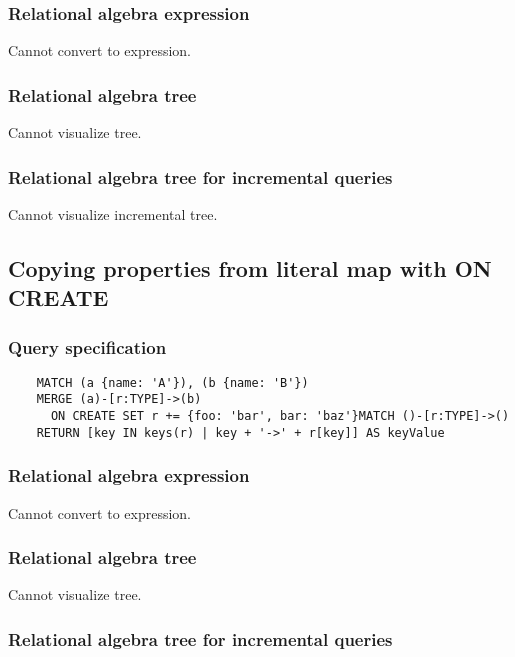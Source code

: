 	\subsubsection*{Relational algebra expression}

	Cannot convert to expression.

	\subsubsection*{Relational algebra tree}

	Cannot visualize tree.

	\subsubsection*{Relational algebra tree for incremental queries}

	Cannot visualize incremental tree.
	\subsection{Copying properties from literal map with ON CREATE}

	\subsubsection*{Query specification}

	\begin{lstlisting}
	MATCH (a {name: 'A'}), (b {name: 'B'})
	MERGE (a)-[r:TYPE]->(b)
	  ON CREATE SET r += {foo: 'bar', bar: 'baz'}MATCH ()-[r:TYPE]->()
	RETURN [key IN keys(r) | key + '->' + r[key]] AS keyValue
	\end{lstlisting}


	\subsubsection*{Relational algebra expression}

	Cannot convert to expression.

	\subsubsection*{Relational algebra tree}

	Cannot visualize tree.

	\subsubsection*{Relational algebra tree for incremental queries}

